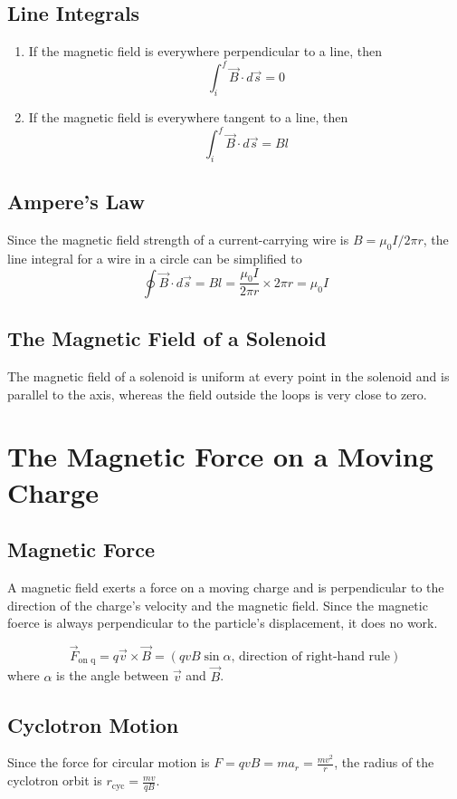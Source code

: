 \documentclass{article}
\begin{document}
\subsection*{Line Integrals}
\begin{enumerate}
    \item If the magnetic field is everywhere perpendicular to a line, then \[\int_i^f\vec{B}
    \cdot d\vec{s}=0\]
    \item If the magnetic field is everywhere tangent to a line, then \[\int_i^f\vec{B}\cdot d
    \vec{s}=Bl\]
\end{enumerate}

\subsection*{Ampere's Law}
Since the magnetic field strength of a current-carrying wire is $B=\mu_0 I / 2\pi r$, the line
integral for a wire in a circle can be simplified to
\[\oint \vec{B}\cdot d \vec{s} = Bl = \frac{\mu_0 I}{2\pi r}\times 2\pi r=\mu_0 I\]

\subsection*{The Magnetic Field of a Solenoid}
The magnetic field of a solenoid is uniform at every point in the solenoid and is parallel to the
axis, whereas the field outside the loops is very close to zero.

\pagebreak
\section*{The Magnetic Force on a Moving Charge}
\subsection*{Magnetic Force}
A magnetic field exerts a force on a moving charge and is perpendicular to the direction of the
charge's velocity and the magnetic field. Since the magnetic foerce is always perpendicular to the
particle's displacement, it does no work.

\[\vec{F}_\text{on q}=q\vec{v}\times \vec{B}=(qvB\sin\alpha\text{, direction of right-hand rule})\]
where $\alpha$ is the angle between $\vec{v}$ and $\vec{B}$.

\subsection*{Cyclotron Motion}
Since the force for circular motion is $F=qvB=ma_r=\frac{mv^2}{r}$, the radius of the cyclotron
orbit is $r_\text{cyc}=\frac{mv}{qB}$.
\vspace{1em}
\end{document}
